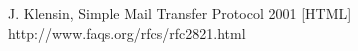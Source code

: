 \newpage
\begin{thebibliography}{99}
 J. Klensin, Simple Mail Transfer Protocol 2001 [HTML] http://www.faqs.org/rfcs/rfc2821.html 


\end{thebibliography}
